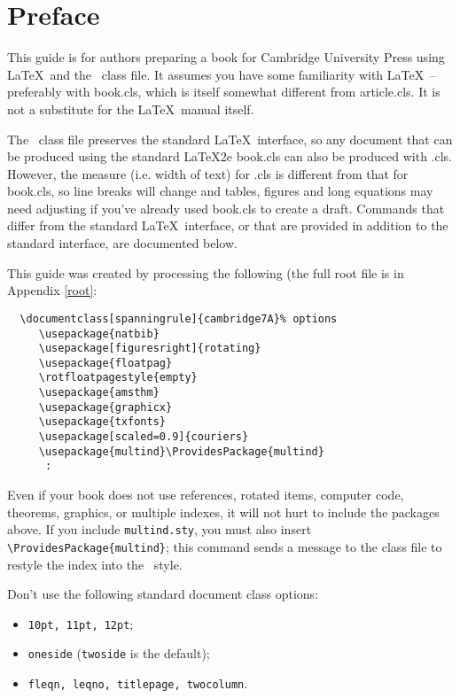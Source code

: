 
\chapter*{Preface}
This guide is for authors preparing a book for
Cambridge University Press using \LaTeX\ and the \cambridge\ class
file. It assumes you have some familiarity with \LaTeX\ --
preferably with book.cls, which is itself somewhat different from article.cls.
It is not a substitute for the \LaTeX\ manual itself.


The \cambridge\  class file preserves the standard \LaTeX\ interface,
so any document that can be produced using the standard
{\LaTeX}2e book.cls can also be produced with {\cambridge}.cls.
However, the measure (i.e. width of text) for {\cambridge}.cls
is different from that for book.cls, so
line breaks will change and tables, figures and
long equations may need adjusting if you've already
used book.cls to create a draft.
Commands that differ from the standard \LaTeX\ interface,
or that are provided in addition to the standard interface,
are documented below.

This guide was created by processing the following
(the full root file is in Appendix \ref{root}:
\begin{verbatim}
  \documentclass[spanningrule]{cambridge7A}% options
     \usepackage{natbib}
     \usepackage[figuresright]{rotating}
     \usepackage{floatpag}
     \rotfloatpagestyle{empty}
     \usepackage{amsthm}
     \usepackage{graphicx}
     \usepackage{txfonts}
     \usepackage[scaled=0.9]{couriers}
     \usepackage{multind}\ProvidesPackage{multind}
      :
\end{verbatim}

Even if your book does not use references, rotated items,
computer code, theorems, graphics, or multiple
indexes, it will not hurt to include the packages above.
If you include \verb"multind.sty",
you must also insert \verb"\ProvidesPackage{multind}"; this command sends a message
to the class file to restyle the index into the \cambridge\ style.

Don't use the following standard document class options:
\begin{itemize}
\item \verb"10pt, 11pt, 12pt";
\item \verb"oneside" (\verb"twoside" is the default);
\item \verb"fleqn, leqno, titlepage, twocolumn".
\end{itemize}


